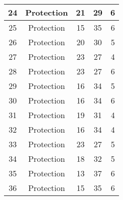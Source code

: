 \documentclass[results.tex]{subfiles}
\begin{document}
\begin{center}
\begin{tabular}{| c || c | c | c | c |}
            \hline
            24                      & Protection                   & 21                     & 29                      & 6                    \\
            \hline
            25                      & Protection                   & 15                     & 35                      & 6                    \\
            \hline
            26                      & Protection                   & 20                     & 30                      & 5                    \\
            \hline
            27                      & Protection                   & 23                     & 27                      & 4                    \\
            \hline
            28                      & Protection                   & 23                     & 27                      & 6                    \\
            \hline
            29                      & Protection                   & 16                     & 34                      & 5                    \\
            \hline
            30                      & Protection                   & 16                     & 34                      & 6                    \\
            \hline
            31                      & Protection                   & 19                     & 31                      & 4                    \\
            \hline
            32                      & Protection                   & 16                     & 34                      & 4                    \\
            \hline
            33                      & Protection                   & 23                     & 27                      & 5                    \\
            \hline
            34                      & Protection                   & 18                     & 32                      & 5                    \\
            \hline
            35                      & Protection                   & 13                     & 37                      & 6                    \\
            \hline
            36                      & Protection                   & 15                     & 35                      & 6                    \\

\end{tabular}
\end{center}
\end{document}
